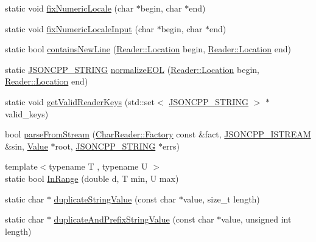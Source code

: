 \begin{DoxyCompactItemize}
\item 
static void \hyperlink{namespace_json_aa208904144dc7b11ccc28f47c9afab9a}{fix\+Numeric\+Locale} (char $\ast$begin, char $\ast$end)
\item 
static void \hyperlink{namespace_json_ac142c270507391c8d86f35b550d36eb4}{fix\+Numeric\+Locale\+Input} (char $\ast$begin, char $\ast$end)
\item 
static bool \hyperlink{namespace_json_a4d6ab0f651348832e5cc49b577a854d2}{contains\+New\+Line} (\hyperlink{class_json_1_1_reader_a46795b5b272bf79a7730e406cb96375a}{Reader\+::\+Location} begin, \hyperlink{class_json_1_1_reader_a46795b5b272bf79a7730e406cb96375a}{Reader\+::\+Location} end)
\item 
static \hyperlink{json_8h_a1e723f95759de062585bc4a8fd3fa4be}{J\+S\+O\+N\+C\+P\+P\+\_\+\+S\+T\+R\+I\+NG} \hyperlink{namespace_json_a63123f3dd63f340ac517a59f44ea7aa4}{normalize\+E\+OL} (\hyperlink{class_json_1_1_reader_a46795b5b272bf79a7730e406cb96375a}{Reader\+::\+Location} begin, \hyperlink{class_json_1_1_reader_a46795b5b272bf79a7730e406cb96375a}{Reader\+::\+Location} end)
\item 
static void \hyperlink{namespace_json_a8c38450840f3d88e9b981ae132f7ad0a}{get\+Valid\+Reader\+Keys} (std\+::set$<$ \hyperlink{json_8h_a1e723f95759de062585bc4a8fd3fa4be}{J\+S\+O\+N\+C\+P\+P\+\_\+\+S\+T\+R\+I\+NG} $>$ $\ast$valid\+\_\+keys)
\item 
bool \hyperlink{namespace_json_a38f903cfdb57a6c4e86a7dcc42f3712c}{parse\+From\+Stream} (\hyperlink{class_json_1_1_char_reader_1_1_factory}{Char\+Reader\+::\+Factory} const \&fact, \hyperlink{json_8h_a15f2f70b2ce0a2abd0f8112393dbc4de}{J\+S\+O\+N\+C\+P\+P\+\_\+\+I\+S\+T\+R\+E\+AM} \&sin, \hyperlink{class_json_1_1_value}{Value} $\ast$root, \hyperlink{json_8h_a1e723f95759de062585bc4a8fd3fa4be}{J\+S\+O\+N\+C\+P\+P\+\_\+\+S\+T\+R\+I\+NG} $\ast$errs)
\item 
{\footnotesize template$<$typename T , typename U $>$ }\\static bool \hyperlink{namespace_json_aff0180507262a244de61b961178d7443}{In\+Range} (double d, T min, U max)
\item 
static char $\ast$ \hyperlink{namespace_json_a678ac3a60cd70ec0fb4c9abfd40eb0c4}{duplicate\+String\+Value} (const char $\ast$value, size\+\_\+t length)
\item 
static char $\ast$ \hyperlink{namespace_json_a9795a09a0141d1f12d307c4386aeaee6}{duplicate\+And\+Prefix\+String\+Value} (const char $\ast$value, unsigned int length)
\item 

\end{DoxyCompactItemize}
